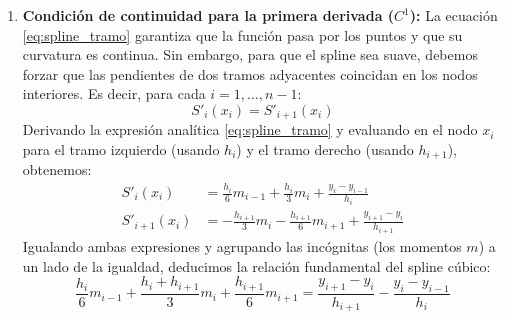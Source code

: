 \begin{enumerate}
    \item \textbf{Condición de continuidad para la primera derivada ($C^1$):}
    La ecuación \eqref{eq:spline_tramo} garantiza que la función pasa por los puntos y que su curvatura es continua. Sin embargo, para que el spline sea suave, debemos forzar que las pendientes de dos tramos adyacentes coincidan en los nodos interiores. Es decir, para cada $i = 1, \dots, n-1$:
    \[
        S'_i(x_i) = S'_{i+1}(x_i)
    \]
    Derivando la expresión analítica \eqref{eq:spline_tramo} y evaluando en el nodo $x_i$ para el tramo izquierdo (usando $h_i$) y el tramo derecho (usando $h_{i+1}$), obtenemos:
    \begin{align*}
        S'_i(x_i) &= \frac{h_i}{6} m_{i-1} + \frac{h_i}{3} m_i + \frac{y_i - y_{i-1}}{h_i} \\
        S'_{i+1}(x_i) &= -\frac{h_{i+1}}{3} m_i - \frac{h_{i+1}}{6} m_{i+1} + \frac{y_{i+1} - y_i}{h_{i+1}}
    \end{align*}
    Igualando ambas expresiones y agrupando las incógnitas (los momentos $m$) a un lado de la igualdad, deducimos la relación fundamental del spline cúbico:
    \begin{equation}
        \frac{h_i}{6} m_{i-1} + \frac{h_i + h_{i+1}}{3} m_i + \frac{h_{i+1}}{6} m_{i+1} = \frac{y_{i+1} - y_i}{h_{i+1}} - \frac{y_i - y_{i-1}}{h_i} \label{eq:relacion_fundamental}
    \end{equation}


\end{enumerate}
